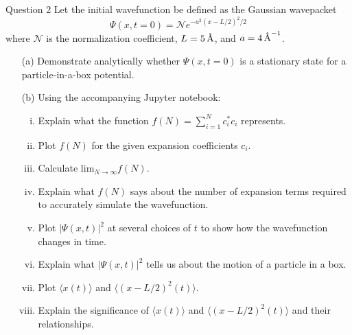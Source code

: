 \documentclass{article}
\begin{document}
\begin{mybox}{Question 2}
Let the initial wavefunction be defined as the Gaussian wavepacket
\[
\Psi(x, t = 0) = \mathcal{N} e^{-a^2(x-L/2)^2/2}
\]
where $\mathcal{N}$ is the normalization coefficient, $L = 5 \, \textup{\AA}$, and $a = 4 \, \textup{\AA}^{-1}$.
\begin{itemize}
    \item[(a)] Demonstrate analytically whether $\Psi(x, t = 0)$ is a stationary state for a particle-in-a-box potential.
    \item[(b)] Using the accompanying Jupyter notebook:
    \begin{enumerate}[i.]
        \item Explain what the function $f(N) = \sum_{i=1}^N c_i^{*}c_i$ represents.
        \item Plot $f(N)$ for the given expansion coefficients $c_i$.
        \item Calculate $\mathrm{lim}_{N\rightarrow\infty} f(N).$
        \item Explain what $f(N)$ says about the number of expansion terms required to accurately simulate the wavefunction.
        \item Plot $|\Psi(x,t)|^2$ at several choices of $t$ to show how the wavefunction changes in time.
        \item Explain what $|\Psi(x,t)|^2$ tells us about the motion of a particle in a box.
        \item Plot $\langle x(t) \rangle$ and $\langle (x-L/2)^2(t) \rangle$.
        \item Explain the significance of $\langle x(t) \rangle$ and $\langle (x-L/2)^2(t) \rangle$ and their relationships.
    \end{enumerate}
\end{itemize}
\end{mybox}
\end{document}

